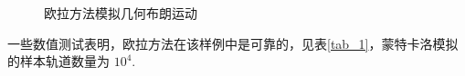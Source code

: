 \begin{figure}[!htbp]
	\centering 
	\caption{欧拉方法模拟几何布朗运动} 
	\vspace{.2cm}
	\label{path_1_2}
\end{figure}

一些数值测试表明，欧拉方法在该样例中是可靠的，见表\ref{tab_1}，蒙特卡洛模拟的样本轨道数量为 $10^4$. 


